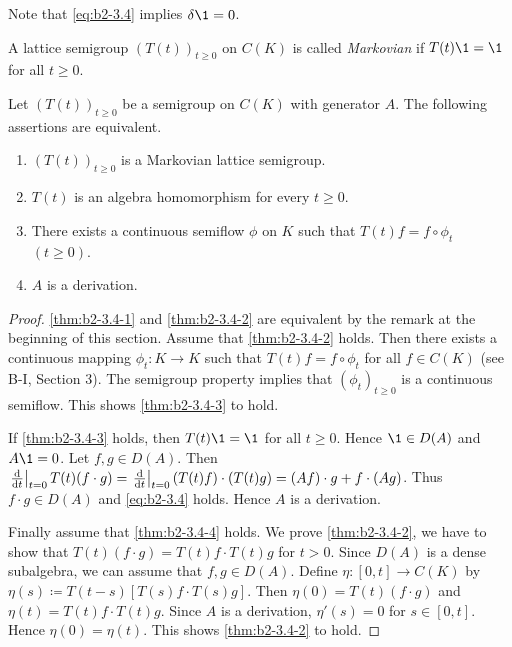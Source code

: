 Note that \eqref{eq:b2-3.4} implies $\delta\1 = 0$.

A lattice semigroup $(T(t))_{t \geq 0}$ on $C(K)$ is called \emph{Markovian} if $T(t)\1 = \1$ for all $t \geq 0$.

\begin{theorem}\label{thm:b2-3.4}
Let $(T(t))_{t \geq 0}$ be a semigroup on $C(K)$ with generator $A$.
The following assertions are equivalent.
\begin{enumerate}[\upshape (a)]
\item \label{thm:b2-3.4-1}
$(T(t))_{t \geq 0}$ is a Markovian lattice semigroup.
\item \label{thm:b2-3.4-2}
$T(t)$ is an algebra homomorphism for every $t \geq 0$.
\item \label{thm:b2-3.4-3}
There exists a continuous semiflow $\phi$ on $K$ such that $T(t)f = f \circ \phi_{t}$ $(t \geq 0)$.
\item \label{thm:b2-3.4-4}
$A$ is a derivation.
\end{enumerate}
\end{theorem}

\begin{proof}
\ref{thm:b2-3.4-1} and \ref{thm:b2-3.4-2} are equivalent by the remark at the beginning of this section.
Assume that \ref{thm:b2-3.4-2} holds.
Then there exists a continuous mapping $\phi_{t} \colon K \to K$ such that $T(t)f = f \circ \phi_{t}$ for all $f \in C(K)$ (see B-I, Section 3).
The semigroup property implies that $(\phi_{t})_{t \geq 0}$ is a continuous semiflow.
This shows \ref{thm:b2-3.4-3}  to hold.

If \ref{thm:b2-3.4-3} holds, then $T(t)\1 = \1$ for all $t \geq 0$. Hence $\1 \in D(A)$ and $A\1 = 0$.
Let $f,g \in D(A)$.
Then $\left.\frac{\mathop{}\!\mathrm{d}{}}{\mathop{}\!\mathrm{d}{t}}\right|_{t=0} T(t)(f \cdot g) = \left.\frac{\mathop{}\!\mathrm{d}{}}{\mathop{}\!\mathrm{d}{t}}\right|_{t=0} (T(t)f) \cdot (T(t)g) = (Af) \cdot g + f \cdot (Ag)$.
Thus $f \cdot g \in D(A)$ and \eqref{eq:b2-3.4} holds.
Hence $A$ is a derivation.

Finally assume that \ref{thm:b2-3.4-4} holds.
We prove \ref{thm:b2-3.4-2}, \ie  we have to show that $T(t)(f \cdot g) = T(t)f \cdot T(t)g$ for $t > 0$.
Since $D(A)$ is a dense subalgebra, we can assume that $f,g \in D(A)$.
Define $\eta \colon [0,t] \to C(K)$ by $\eta(s) \coloneqq T(t-s)[T(s)f \cdot T(s)g]$.
Then $\eta(0) = T(t)(f \cdot g)$ and $\eta(t) = T(t)f \cdot T(t)g$.
Since $A$ is a derivation, $\eta'(s) = 0$ for $s \in [0,t]$.
Hence $\eta(0) = \eta(t)$.
This shows \ref{thm:b2-3.4-2} to hold.
\end{proof}

